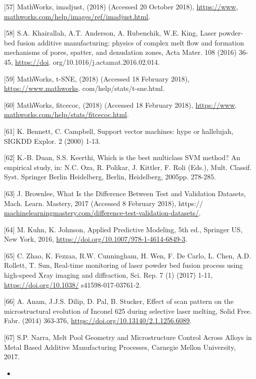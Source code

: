 \documentclass[10pt]{article}
\begin{document}
[57] MathWorks, imadjust, (2018) (Accessed 20 October 2018), \href{https://www}{https://www}, \href{http://mathworks.com/help/images/ref/imadjust.html}{mathworks.com/help/images/ref/imadjust.html}.

[58] S.A. Khairallah, A.T. Anderson, A. Rubenchik, W.E. King, Laser powder-bed fusion additive manufacturing: physics of complex melt flow and formation mechanisms of pores, spatter, and denudation zones, Acta Mater. 108 (2016) 36-45, \href{https://doi}{https://doi}. org/10.1016/j.actamat.2016.02.014.

[59] MathWorks, t-SNE, (2018) (Accessed 18 February 2018), \href{https://www.mathworks}{https://www.mathworks}. com/help/stats/t-sne.html.

[60] MathWorks, fitcecoc, (2018) (Accessed 18 February 2018), \href{https://www}{https://www}. \href{http://mathworks.com/help/stats/fitcecoc.html}{mathworks.com/help/stats/fitcecoc.html}.

[61] K. Bennett, C. Campbell, Support vector machines: hype or hallelujah, SIGKDD Explor. 2 (2000) 1-13.

[62] K.-B. Duan, S.S. Keerthi, Which is the best multiclass SVM method? An empirical study, in: N.C. Oza, R. Polikar, J. Kittler, F. Roli (Eds.), Mult. Classif. Syst. Springer Berlin Heidelberg, Berlin, Heidelberg, 2005pp. 278-285.

[63] J. Brownlee, What Is the Difference Between Test and Validation Datasets, Mach. Learn. Mastery, 2017 (Accessed 8 February 2018), https:// \href{http://machinelearningmastery.com/difference-test-validation-datasets/}{machinelearningmastery.com/difference-test-validation-datasets/}.

[64] M. Kuhn, K. Johnson, Applied Predictive Modeling, 5th ed., Springer US, New York, 2016, \href{https://doi.org/10.1007/978-1-4614-6849-3}{https://doi.org/10.1007/978-1-4614-6849-3}.

[65] C. Zhao, K. Fezzaa, R.W. Cunningham, H. Wen, F. De Carlo, L. Chen, A.D. Rollett, T. Sun, Real-time monitoring of laser powder bed fusion process using high-speed Xray imaging and diffraction, Sci. Rep. 7 (1) (2017) 1-11, \href{https://doi.org/10.1038/}{https://doi.org/10.1038/} s41598-017-03761-2.

[66] A. Anam, J.J.S. Dilip, D. Pal, B. Stucker, Effect of scan pattern on the microstructural evolution of Inconel 625 during selective laser melting, Solid Free. Fabr. (2014) 363-376, \href{https://doi.org/10.13140/2.1.1256.6089}{https://doi.org/10.13140/2.1.1256.6089}.

[67] S.P. Narra, Melt Pool Geometry and Microstructure Control Across Alloys in Metal Based Additive Manufacturing Processes, Carnegie Mellon University, 2017.

\begin{itemize}
  \item 
\end{itemize}
\end{document}
